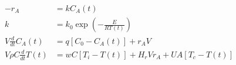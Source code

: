 
\begin{equation}
  \begin{aligned}
    -r_A                      & = kC_A(t)
    \\
    k                         & = k_0 \exp(-\frac{E}{RT(t)})
    \\
    V\frac{d}{dt}C_A(t)       & = q [C_0 - C_A(t)] + r_A V
    \\
    V \rho C \frac{d}{dt}T(t) & = w C [T_i - T(t)] + H_r V r_A + U A [T_c - T(t)]
  \end{aligned}
  \label{eq:CSTR_1storder01_3}
\end{equation}
